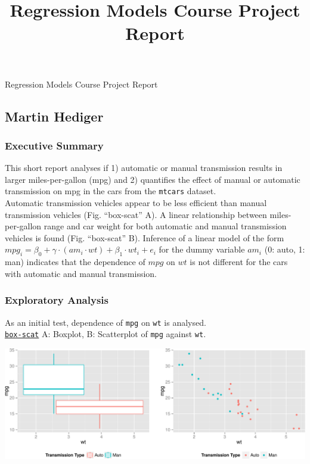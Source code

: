 \documentclass[]{article}
\title{Regression Models Course Project Report}
\author{}
\date{}
\begin{document}
\begin{center}
\huge Regression Models Course Project Report \\[0.2cm]
\end{center}
\normalsize


\subsection{Martin Hediger}\label{martin-hediger}

\subsubsection{Executive Summary}\label{executive-summary}

This short report analyses if 1) automatic or manual transmission
results in larger miles-per-gallon (mpg) and 2) quantifies the effect of
manual or automatic transmission on mpg in the cars from the
\texttt{mtcars} dataset.\\Automatic transmission vehicles appear to be
less efficient than manual transmission vehicles (Fig. ``box-scat'' A).
A linear relationship between miles-per-gallon range and car weight for
both automatic and manual transmission vehicles is found (Fig.
``box-scat'' B). Inference of a linear model of the form
$mpg_i = \beta_0 + \gamma \cdot (am_i \cdot wt) + \beta_1 \cdot wt_i + e_i$
for the dummy variable $am_i$ (0: auto, 1: man) indicates that the
dependence of $mpg$ on $wt$ is not different for the cars with automatic
and manual transmission.

\subsubsection{Exploratory Analysis}\label{exploratory-analysis}

As an initial test, dependence of \texttt{mpg} on \texttt{wt} is
analysed.\\\href{https://github.com/mzhKU/regmods_course_project/blob/master/box-scat.R}{\texttt{box-scat}}
A: Boxplot, B: Scatterplot of \texttt{mpg} against \texttt{wt}.

\includegraphics{./article_files/figure-latex/unnamed-chunk-1.pdf}
\end{document}
